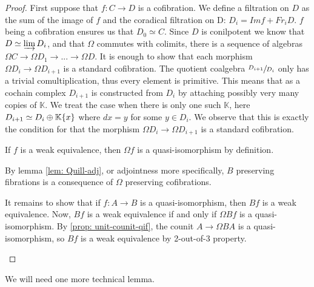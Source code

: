 \documentclass[../thesis.tex]{subfiles}
\begin{document}
            \begin{proof}
                First suppose that $f : C\rightarrow D$ is a cofibration. We define a filtration on $D$ as the sum of the image of $f$ and the coradical filtration on D: $D_i = Imf + Fr_iD$. $f$ being a cofibration ensures us that $D_0 \simeq C$. Since $D$ is conilpotent we know that $D \simeq \varinjlim D_i$, and that $\Omega$ commutes with colimits, there is a sequence of algebras $\Omega C \rightarrow \Omega D_1 \rightarrow ... \rightarrow \Omega D$. It is enough to show that each morphism $\Omega D_i \rightarrow \Omega D_{i+1}$ is a standard cofibration. The quotient coalgebra $\sfrac{D_{i+1}}{D_i}$ only has a trivial comultiplication, thus every element is primitive. This means that as a cochain complex $D_{i+1}$ is constructed from $D_i$ by attaching possibly very many copies of $\mathbb{K}$. We treat the case when there is only one such $\mathbb{K}$, here $D_{i+1} \simeq D_i \oplus \mathbb{K}\{x\}$ where $dx = y$ for some $y\in D_i$. We observe that this is exactly the condition for that the morphism $\Omega D_i \rightarrow \Omega D_{i+1}$ is a standard cofibration.

                If $f$ is a weak equivalence, then $\Omega f$ is a quasi-isomorphism by definition.

                By lemma \ref{lem: Quill-adj}, or adjointness more specifically, $B$ preserving fibrations is a consequence of $\Omega$ preserving cofibrations.

                It remains to show that if $f: A\rightarrow B$ is a quasi-isomorphism, then $Bf$ is a weak equivalence. Now, $Bf$ is a weak equivalence if and only if $\Omega Bf$ is a quasi-isomorphism. By \ref{prop: unit-counit-qif}, the counit $A \rightarrow \Omega BA$ is a quasi-isomorphism, so $Bf$ is a weak equivalence by 2-out-of-3 property.

                \begin{center}
                \end{center}
            \end{proof}

            We will need one more technical lemma.
\end{document}
